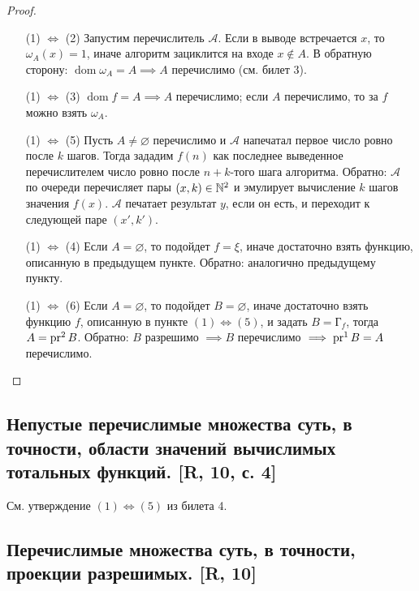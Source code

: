 \documentclass[a4paper, fleqn]{article}
\DeclareMathOperator{\dom}{\mathop{\mathrm{dom}}}
\newcommand{\void}{\varnothing} %
\newcommand{\plot}{\text{Г}} %
\begin{document}
        \begin{proof}
        \begin{enumerate}[leftmargin=22mm]
            \item[]
            \item[(1) $\iff$ (2)] Запустим перечислитель $\mathcal{A}$. Если в выводе встречается $x$, то $\omega_A(x) = 1$, иначе алгоритм зациклится на входе $x \notin A$. В обратную сторону: $\dom \omega_A = A \implies A$ перечислимо (см. билет 3).

            \item[(1) $\iff$ (3)] $\dom f = A \implies A$ перечислимо; если $A$ перечислимо, то за $f$ можно взять $\omega_A$.

            \item[(1) $\iff$ (5)] Пусть $A \ne \void$ перечислимо и $\mathcal{A}$ напечатал первое число ровно после $k$ шагов. Тогда зададим $f(n)$ как последнее выведенное перечислителем число ровно после $n + k$-того шага алгоритма. Обратно: $\mathcal{A}$ по очереди перечисляет пары $(x, k) \in \mathbb{N}^2$ и эмулирует вычисление $k$ шагов значения $f(x)$. $\mathcal{A}$ печатает результат $y$, если он есть, и переходит к следующей паре $(x', k')$.

            \item[(1) $\iff$ (4)] Если $A = \void$, то подойдет $f = \xi$, иначе достаточно взять функцию, описанную в предыдущем пункте. Обратно: аналогично предыдущему пункту.

            \item[(1) $\iff$ (6)] Если $A = \void$, то подойдет $B = \void$, иначе достаточно взять функцию $f$, описанную в пункте $(1) \iff (5)$, и задать $B = \plot_{f}$, тогда $A = \operatorname{\mathop{\mathrm{pr}}}^2 B$. Обратно: $B$ разрешимо $\implies B$ перечислимо $\implies \operatorname{\mathop{\mathrm{pr}}}^1 B = A$ перечислимо. \qedhere
        \end{enumerate}
        \end{proof}

    \subsection{Непустые перечислимые множества суть, в точности, области значений вычислимых тотальных функций. [R, 10, с. 4]}

        См. утверждение $(1) \iff (5)$ из билета 4.

    \subsection{Перечислимые множества суть, в точности, проекции разрешимых. [R, 10]}
\end{document}

